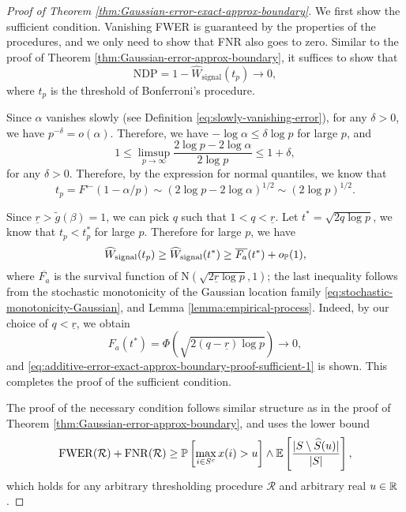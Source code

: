 \begin{proof}[Proof of Theorem \ref{thm:Gaussian-error-exact-approx-boundary}]
We first show the sufficient condition. 
Vanishing FWER is guaranteed by the properties of the procedures, and we only need to show that FNR also goes to zero. 
Similar to the proof of Theorem \ref{thm:Gaussian-error-approx-boundary}, it suffices to show that
\begin{equation} \label{eq:additive-error-exact-approx-boundary-proof-sufficient-1}
    \text{NDP} = 1 - \widehat{W}_\text{signal}(t_p) \to 0,
\end{equation}
where $t_p$ is the threshold of Bonferroni's procedure.

Since $\alpha$ vanishes slowly (see Definition \ref{eq:slowly-vanishing-error}), for any $\delta>0$, we have $p^{-\delta}=o(\alpha)$.
Therefore, we have $-\log\alpha\le\delta\log{p}$ for large $p$, and
\begin{equation*} 
    1 \le \limsup_{p\to\infty}\frac{2\log{p} - 2\log{\alpha}}{2\log{p}} \le 1+\delta,
\end{equation*}
for any $\delta>0$.
Therefore, by the expression for normal quantiles, we know that 
$$
t_p=F^\leftarrow(1-\alpha/p)\sim(2\log{p}-2\log{\alpha})^{1/2} \sim(2\log{p})^{1/2}.
$$

Since $\underline{r}>\widetilde{g}(\beta)=1$, we can pick $q$ such that $1<q<\underline{r}$.
Let $t^* = \sqrt{2q\log{p}}$, we know that $t_p<t_p^*$ for large $p$.
Therefore for large $p$, we have
$$
\widehat{W}_\text{signal}(t_p) \ge \widehat{W}_\text{signal}(t^*) \ge \overline{F_a}(t^*) + o_\P(1),
$$
where $\overline{F_a}$ is the survival function of $\mathrm{N}(\sqrt{2\underline{r}\log{p}}, 1)$; the last inequality follows from the stochastic monotonicity of the Gaussian location family \eqref{eq:stochastic-monotonicity-Gaussian}, and Lemma \ref{lemma:empirical-process}.
Indeed, by our choice of $q<\underline{r}$, we obtain
$$
F_a(t^*) = \Phi\left(\sqrt{2(q-\underline{r})\log{p}}\right)\to0,
$$
and \eqref{eq:additive-error-exact-approx-boundary-proof-sufficient-1} is shown. 
This completes the proof of the sufficient condition.

The proof of the necessary condition follows similar structure as in the proof of Theorem \ref{thm:Gaussian-error-approx-boundary}, and uses the lower bound
\begin{equation} \label{eq:additive-error-exact-approx-boundary-proof-necessary-1}
    \mathrm{FWER}(\mathcal{R}) + \mathrm{FNR}(\mathcal{R}) \ge \P\left[\max_{i\in S^c}x(i)>u\right] \wedge \E\left[\frac{|S\setminus \widehat{S}(u)|}{|S|}\right],
\end{equation}
which holds for any arbitrary thresholding procedure $\mathcal{R}$ and arbitrary real $u\in\R$.


\end{proof}
